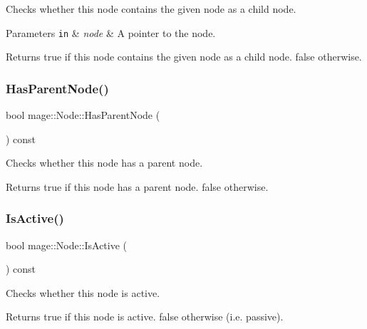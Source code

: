 Checks whether this node contains the given node as a child node.


\begin{DoxyParams}[1]{Parameters}
\mbox{\tt in}  & {\em node} & A pointer to the node. \\
\hline
\end{DoxyParams}
\begin{DoxyReturn}{Returns}
{\ttfamily true} if this node contains the given node as a child node. {\ttfamily false} otherwise. 
\end{DoxyReturn}
\hypertarget{classmage_1_1_node_acc47eb0f2eaa60e71fd945e79b4f622d}{}\label{classmage_1_1_node_acc47eb0f2eaa60e71fd945e79b4f622d} 
\subsubsection{\texorpdfstring{Has\+Parent\+Node()}{HasParentNode()}}
{\footnotesize\ttfamily bool mage\+::\+Node\+::\+Has\+Parent\+Node (\begin{DoxyParamCaption}{ }\end{DoxyParamCaption}) const\hspace{0.3cm}{\ttfamily [noexcept]}}

Checks whether this node has a parent node.

\begin{DoxyReturn}{Returns}
{\ttfamily true} if this node has a parent node. {\ttfamily false} otherwise. 
\end{DoxyReturn}
\hypertarget{classmage_1_1_node_a6fce6afdcfdde0e5dff5b219cee4f372}{}\label{classmage_1_1_node_a6fce6afdcfdde0e5dff5b219cee4f372} 
\subsubsection{\texorpdfstring{Is\+Active()}{IsActive()}}
{\footnotesize\ttfamily bool mage\+::\+Node\+::\+Is\+Active (\begin{DoxyParamCaption}{ }\end{DoxyParamCaption}) const\hspace{0.3cm}{\ttfamily [noexcept]}}

Checks whether this node is active.

\begin{DoxyReturn}{Returns}
{\ttfamily true} if this node is active. {\ttfamily false} otherwise (i.\+e. passive). 
\end{DoxyReturn}
\hypertarget{classmage_1_1_node_a5fb6ac39c7e0d630944594cd5426f61a}{}\label{classmage_1_1_node_a5fb6ac39c7e0d630944594cd5426f61a} 
